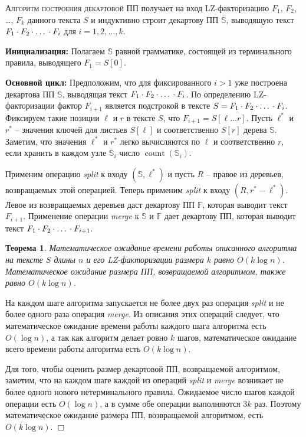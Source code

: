 ﻿\documentclass[11pt]{article}
\newtheorem{thm}{Теорема}[section]
\theoremstyle{remark}
\newcommand{\qqed}{\hfill$\Box$}
\renewenvironment{proof}{\trivlist\item[\hskip\labelsep{\bf Доказательство}.] }{\qqed\endtrivlist}
\newcommand{\header}[1]{
    \noindent \textsc{#1}
}
\newcommand{\substr}[2]{[#1\dots#2]}
\newcommand{\slp}[1]{\mathbb{#1}}
\newcommand{\concat}[4]{
    #1_{#2} \cdot #1_{#3} \cdot \mbox{\dots} \cdot #1_{#4}
}
\DeclareMathOperator{\cnt}{count} \DeclareMathOperator{\splt}{\emph{split}}
\begin{document}
\medskip

\header{Алгоритм построения декартовой ПП} получает на вход LZ-фак\-то\-ри\-за\-цию $F_1$, $F_2$, \dots, $F_k$ данного текста $S$ и
индуктивно строит декартову ПП $\slp{S}$, выводящую текст $\concat{F}{1}{2}{i}$ для $i=1,2,\dots,k$.

\smallskip

\noindent\textbf{Инициализация:} Полагаем $\slp{S}$ равной грамматике, состоящей из терминального правила, выводящего $F_1=S[0]$.

\smallskip

\noindent\textbf{Основной цикл:} Предположим, что для фиксированного $i>1$ уже построена декартова ПП $\slp{S}$, выводящая текст
$\concat{F}{1}{2}{i}$. По определению  LZ-факторизации фактор $F_{i+1}$ является подстрокой в тексте $S=\concat{F}{1}{2}{i}$. Фиксируем
такие позиции $\ell$ и $r$ в тексте $S$, что $F_{i+1}=S\substr{\ell}{r}$. Пусть $\ell^*$ и $r^*$ -- значения ключей для листьев $S[\ell]$ и
соответственно $S[r]$ дерева $\slp{S}$. Заметим, что значения $\ell^*$ и $r^*$ легко вычисляются по $\ell$ и соответственно $r$, если
хранить в каждом узле $\slp{S}_i$ число $\cnt(\slp{S}_i)$.

Применим операцию \emph{split} к входу $(\slp{S}, \ell^*)$ и пусть $R$ -- правое из деревьев, возвращаемых этой операцией. Теперь применим
\emph{split} к входу $(R,r^*-\ell^*)$. Левое из возвращаемых деревьев даст декартову ПП $\slp{F}$, которая выводит текст $F_{i+1}$.
Применение операции \emph{merge} к $\slp{S}$ и $\slp{F}$ дает декартову ПП, которая выводит текст $\concat{F}{1}{2}{i+1}$.

\begin{thm}
\label{thm:cartesian} Математическое ожидание времени работы описанного алгоритма на тексте $S$ длины $n$ и его LZ-факторизации размера $k$
равно $O(k\log n)$. Математическое ожидание размера ПП, возвращаемой алгоритмом, также равно $O(k\log n)$.
\end{thm}

\begin{proof}
На каждом шаге алгоритма запускается не более двух раз операция \emph{split} и не более одного раза операция \emph{merge}. Из описания этих
операций следует, что математическое ожидание времени работы каждого шага алгоритма есть $O(\log n)$, а так как алгоритм делает ровно $k$
шагов, математическое ожидание всего времени работы алгоритма есть $O(k \log n)$.

Для того, чтобы оценить размер декартовой ПП, возвращаемой алгоритмом, заметим, что на каждом шаге каждой из операций \emph{split} и
\emph{merge} возникает не более одного нового нетерминального правила. Ожидаемое число шагов каждой операции есть $O(\log n)$, а в сумме
обе операции выполняются $3k$ раз. Поэтому математическое ожидание размера ПП, возвращаемой алгоритмом, есть $O(k \log n)$.
\end{proof}
\end{document}
